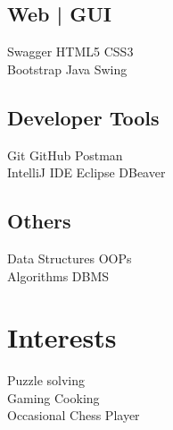 \documentclass[]{deedy-resume-openfont}
\begin{document}
\begin{minipage}[t]{0.33\textwidth}
\subsection{Web | GUI}
\textbullet{} Swagger
  \textbullet{} HTML5 \textbullet{} CSS3 \\ \textbullet{} Bootstrap \textbullet{} Java Swing
\sectionsep

\subsection{Developer Tools}
 \textbullet{} Git \textbullet{} GitHub \textbullet{} \textbullet{} Postman \\ IntelliJ IDE \textbullet{} Eclipse \textbullet{} DBeaver \\


\sectionsep

\subsection{Others}
\textbullet{} Data Structures  
\textbullet{} OOPs \\ \textbullet{} Algorithms 
\textbullet{} DBMS 
\sectionsep


\section{Interests}
\textbullet{} Puzzle solving  \\ 
\textbullet{} Gaming  
\textbullet{} Cooking \\
\textbullet{} Occasional Chess Player \\
\sectionsep

%
%

\end{minipage} 
\hfill
\end{document}
